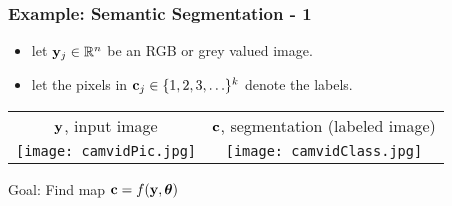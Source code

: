 \documentclass[12pt,fleqn]{beamer}
\begin{document}
\begin{frame}\frametitle{Example:  Semantic Segmentation - 1}

\begin{itemize}
	\item
	let ${\bf y}_j \in \mathbb{R}^n$ be an RGB or grey valued image.
	\item let the pixels in ${\bf c}_j\in \{1,2,3,\ldots \}^k$ denote the labels.
\end{itemize}

\begin{center}
	\begin{tabular}{cc}
		${\bf y}$, input image & ${\bf c}$, segmentation (labeled image)\\
	\texttt{[image: camvidPic.jpg]} &
	\texttt{[image: camvidClass.jpg]} 
	\end{tabular}

	Goal: Find map ${\bf c}  = f({\bf y},{\boldsymbol \theta})$ 

\end{center}


\end{frame}
\end{document}
